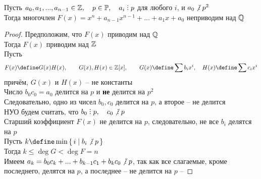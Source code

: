 \begin{theorem}
	Пусть $a_0, a_1, ..., a_{n - 1} \in \Z, \quad p \in \Prime, \quad a_i \divby p$ для любого $i$, и $a_0 \ndivby p^2 $ \\
	Тогда многочлен $ F(x) = x^n + a_{n - 1}x^{n - 1} + ... + a_1x + a_0 $ неприводим над $\mathbb{Q}$
\end{theorem}

\begin{proof}
	Предположим, что $F(x)$ приводим над $\mathbb{Q}$ \\
	Тогда $F(x)$ приводим над $\mathbb{Z}$ \\
	Пусть
	$$ F(x) \define G(x)H(x), \qquad G(x), H(x) \in \Z[x], \qquad G(x) \define \sum b_ix^i, \quad H(x) \define \sum c_ix^i $$
	причём, $G(x)$ и $H(x)$ -- не константы \\
	Число $b_0c_0 = a_0$ делится на $p$ и \textbf{не} делится на $p^2$ \\
	Следовательно, одно из чисел $b_0, c_0$ делится на $p$, а второе -- не делится \\
	НУО будем считать, что $b_0 \divby p, \quad c_0 \ndivby p $ \\
	Старший коэффициент $F(x)$ не делится на $p$, следовательно, не все $b_i$ делятся на $p$ \\
	Пусть $ k \define \min\set{i | b_i \ndivby p} $ \\
	Тогда $k \le \deg G < \deg F = n $ \\
	Имеем $a_k = b_0c_k + ... + b_{k - 1}c_1 + b_kc_0 \ndivby p $, так как все слагаемые, кроме последнего, делятся на $p$, а последнее -- не делится на $p$ -- \contra
\end{proof}
